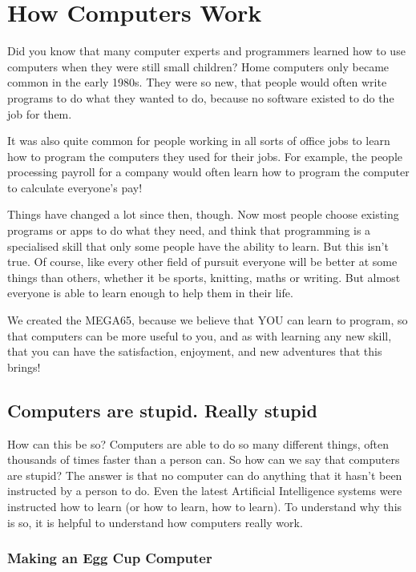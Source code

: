 \chapter{How Computers Work}

Did you know that many computer experts and programmers learned how to
use computers when they were still small children?
Home computers only became common in the early 1980s. They were so new,
that people would often write programs to do
what they wanted to do, because no software existed to do the job for them.

It was also quite common for people working in all
sorts of office jobs to learn how to program the computers they used for
their jobs.  For example, the people processing payroll
for a company would often learn how to program the computer to calculate
everyone's pay!

Things have changed a lot since then, though.
Now most people choose existing programs or apps to do what they need,
and think that programming is a specialised skill that only some people
have the ability to learn.
But this isn't true.  Of course, like every other field of pursuit
everyone will be better at some things than others,
whether it be sports, knitting, maths or writing. But almost
everyone is able to learn enough to help them in their life.

We created the MEGA65, because we believe that YOU can learn to
program, so that computers can be more useful to you, and as with
learning any new skill, that you can have the satisfaction, enjoyment,
and new adventures that this brings!


\section{Computers are stupid. Really stupid}

How can this be so? Computers are able to do so many different things, often thousands of times faster than a person can.
So how can we say that computers are stupid?  The answer is that no computer can do anything that it hasn't been instructed
by a person to do.  Even the latest Artificial Intelligence systems were instructed how to learn (or how to learn, how to learn).
To understand why this is so, it is helpful to understand how computers really work.

\subsection{Making an Egg Cup Computer}

